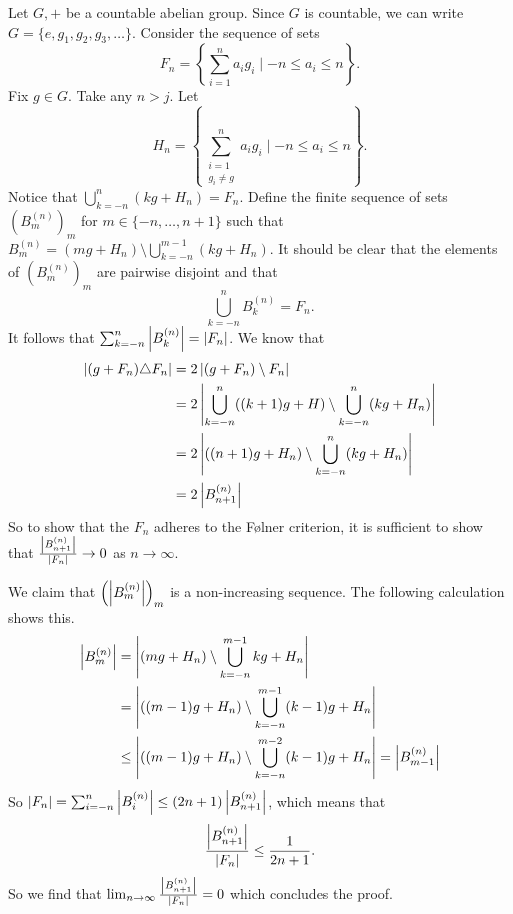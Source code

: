 Let $G,+$ be a countable abelian group.
Since $G$ is countable, we can write $G = \{e, g_1, g_2, g_3, \dots\}$.
Consider the sequence of sets $$F_n = \left\{\sum_{i = 1}^n a_i g_i \mid -n \le a_i \le n\right\}.$$ 
Fix $g \in G$. Take any $n > j$.
Let $$H_n = \left\{\sum_{\substack{i = 1 \\ g_i \ne g}}^n a_i g_i \mid -n \le a_i \le n\right\}.$$
Notice that $\bigcup_{k = -n}^{n} (kg+H_n) = F_n$.
Define the finite sequence of sets $(B_m^{(n)})_m$ for $m \in \{-n, \dots, n+1\}$ such that  
$B_m^{(n)} = (mg+H_n) \setminus \bigcup_{k=-n}^{m-1}(kg+H_n)$.
It should be clear that the elements of $(B_m^{(n)})_m$ are pairwise disjoint and that  \[
    \bigcup_{k = -n}^n B_k^{(n)} = F_n 
.\] 
It follows that $\sum_{k=-n}^{n} \left| B_k^{(n)} \right| = \left| F_n \right|$. We know that 
\begin{align*}
    \left| (g+F_n) \triangle F_n \right| &= 2 \left| (g + F_n) \setminus F_n \right| \\
    &= 2 \left| \bigcup_{k = -n}^n ((k+1)g+H) \setminus \bigcup_{k = -n}^n (kg+H_n) \right|\\
    &=  2 \left| ((n+1)g+H_n) \setminus \bigcup_{k = -n}^n (kg+H_n) \right|\\
    &= 2 \left| B_{n+1}^{(n)} \right|
\end{align*}
So to show that the $F_n$ adheres to the Følner criterion, it is sufficient to show that $\frac{\left| B_{n+1}^{(n)} \right|}{\left| F_n \right|} \to 0$ as $n \to \infty$.

We claim that $\left(\left| B_m^{(n)} \right|\right)_m$ is a non-increasing sequence. The following calculation shows this.
\begin{align*}
    \left| B_m^{(n)} \right| &= \left| (mg+H_n) \setminus \bigcup_{k=-n}^{m-1} kg+H_n \right|\\
    &= \left| ((m-1)g+H_n) \setminus \bigcup_{k=-n}^{m-1}(k-1)g+H_n \right|\\
    &\le \left| ((m-1)g+H_n) \setminus \bigcup_{k=-n}^{m-2} (k-1)g+H_n \right| = \left| B_{m-1}^{(n)} \right|
\end{align*}
So $\left| F_n \right| = \sum_{i=-n}^{n} \left| B_i^{(n)} \right| \le (2n+1) \left| B_{n+1}^{(n)} \right|$, which means that $$\frac{\left| B_{n+1}^{(n)} \right|}{\left| F_n \right|} \le \frac{1}{2n+1}.$$
So we find that $\lim_{n \to \infty}\frac{\left| B_{n+1}^{(n)} \right|}{\left| F_n \right|} = 0$ which concludes the proof. 
